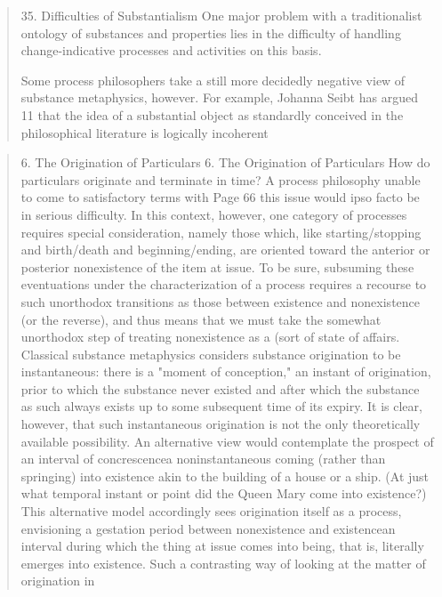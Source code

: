 \documentclass[a4paper]{Thesis}
\begin{document}
\begin{quotation}
	35. Difficulties of Substantialism
	One major problem with a traditionalist ontology of substances and properties lies in the
	difficulty of handling change-indicative processes and activities on this basis.
	
	Some process philosophers take a still more decidedly negative view of substance
	metaphysics, however. For example, Johanna Seibt has argued 11 that the idea of a
	substantial object as standardly conceived in the philosophical literature is logically
	incoherent
\end{quotation}

\begin{quotation}
	6. The Origination of Particulars	
	6. The Origination of Particulars
	How do particulars originate and terminate in time? A process philosophy unable to come
	to satisfactory terms with
	Page 66
	this issue would ipso facto be in serious difficulty. In this context, however, one category
	of processes requires special consideration, namely those which, like starting/stopping
	and birth/death and beginning/ending, are oriented toward the anterior or posterior
	nonexistence of the item at issue. To be sure, subsuming these eventuations under the
	characterization of a process requires a recourse to such unorthodox transitions as those
	between existence and nonexistence (or the reverse), and thus means that we must take
	the somewhat unorthodox step of treating nonexistence as a (sort of state of affairs.
	Classical substance metaphysics considers substance origination to be instantaneous:
	there is a "moment of conception," an instant of origination, prior to which the substance
	never existed and after which the substance as such always exists up to some
	subsequent time of its expiry. It is clear, however, that such instantaneous origination is
	not the only theoretically available possibility. An alternative view would contemplate the
	prospect of an interval of concrescencea noninstantaneous coming (rather than springing)
	into existence akin to the building of a house or a ship. (At just what temporal instant or
	point did the Queen Mary come into existence?) This alternative model accordingly sees
	origination itself as a process, envisioning a gestation period between nonexistence and
	existencean interval during which the thing at issue comes into being, that is, literally
	emerges into existence. Such a contrasting way of looking at the matter of origination in

\end{quotation}
\end{document}
